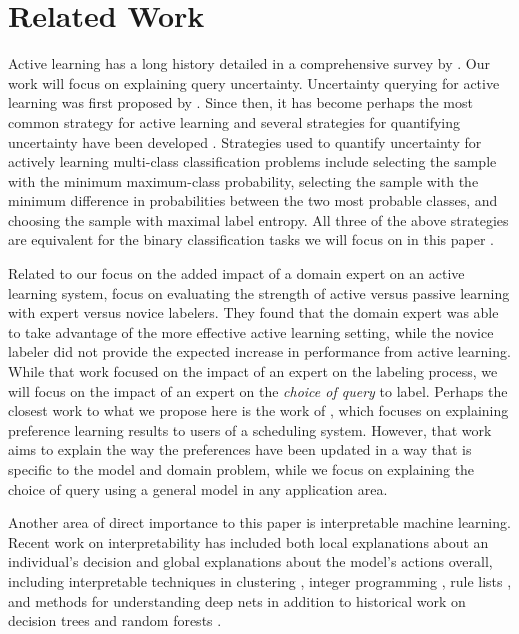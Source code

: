 \section{Related Work}
Active learning has a long history detailed in a comprehensive survey by \citet{settles.tr09}.  Our work will focus on explaining query uncertainty.  Uncertainty querying for active learning was first proposed by \citet{Gale}. Since then, it has become perhaps the most common strategy for active learning and  several strategies for quantifying uncertainty have been developed \cite{settles.tr09}. Strategies used to quantify uncertainty for actively learning multi-class classification problems include selecting the sample with the minimum maximum-class probability, selecting the sample with the minimum difference in probabilities between the two most probable classes, and choosing the sample with maximal label entropy.  All three of the above strategies are equivalent for the binary classification tasks we will focus on in this paper \cite{settles.tr09}.

Related to our focus on the added impact of a domain expert on an active learning system, \cite{BaldridgePalmer2009} focus on evaluating the strength of active versus passive learning with expert versus novice labelers.  They found that the domain expert was able to take advantage of the more effective active learning setting, while the novice labeler did not provide the expected increase in performance from active learning.  While that work focused on the impact of an expert on the labeling process, we will focus on the impact of an expert on the \emph{choice of query} to label.  Perhaps the closest work to what we propose here is the work of \cite{Glass2006Explaining}, which focuses on explaining preference learning results to users of a scheduling system.  However, that work aims to explain the way the preferences have been updated in a way that is specific to the model and domain problem, while we focus on explaining the choice of query using a general model in any application area. 

Another area of direct importance to this paper is interpretable machine learning.  Recent work on interpretability has included both local explanations about an individual's decision \cite{LIME} and global explanations about the model's actions overall, including interpretable techniques in clustering \cite{interpretableClustering}, integer programming \cite{SLIMrecidivism}, rule lists \cite{WangRudin2015Falling}, and methods for understanding deep nets \cite{Zeiler2014Visualizing, Le2013Building} in addition to historical work on decision trees \cite{Quinlan1993C4.5} and random forests \cite{breiman2001random}.

